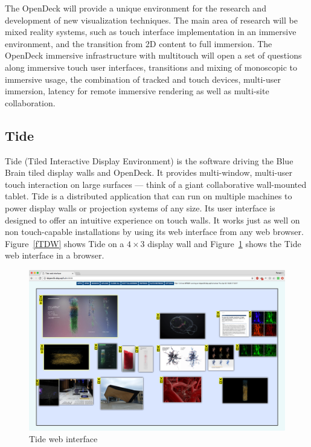\documentclass[10pt]{llncs}
\newcommand{\fig}[1]{Figure~\ref{#1}}
\begin{document}
The OpenDeck will provide a unique environment for the research and development
of new visualization techniques. The main area of research will be mixed reality
systems, such as touch interface implementation in an immersive environment, and
the transition from 2D content to full immersion. The OpenDeck immersive
infrastructure with multitouch will open a set of questions along immersive
touch user interfaces, transitions and mixing of monoscopic to immersive usage,
the combination of tracked and touch devices, multi-user immersion, latency for
remote immersive rendering as well as multi-site collaboration.

\subsection{Tide}

Tide (Tiled Interactive Display Environment) is the software driving the Blue
Brain tiled display walls and OpenDeck. It provides multi-window, multi-user
touch interaction on large surfaces --- think of a giant collaborative
wall-mounted tablet. Tide is a distributed application that can run on multiple
machines to power display walls or projection systems of any size. Its user
interface is designed to offer an intuitive experience on touch walls. It works
just as well on non touch-capable installations by using its web interface from
any web browser. \fig{fTDW} shows Tide on a $4\times 3$ display wall and
\fig{fTideWeb} shows the Tide web interface in a browser.

\begin{figure}[h!t]
  \includegraphics[width=\columnwidth]{images/tideweb}
  \caption{\label{fTideWeb}Tide web interface}
\end{figure}
\end{document}
